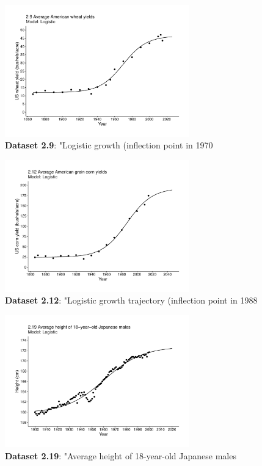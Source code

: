 \documentclass[aps,rmp,preprint,superscriptaddress,10pt,onecolumn]{article}
\begin{document}
\begin{figure}[h]
\includegraphics[width=8cm]{output/figs-ggplot/2.9.pdf}
\caption{\textbf{Dataset 2.9}: "Logistic growth (inflection point in 1970}
\end{figure}
	
\begin{figure}[h]
\includegraphics[width=8cm]{output/figs-ggplot/2.12.pdf}
\caption{\textbf{Dataset 2.12}: "Logistic growth trajectory (inflection point in 1988}
\end{figure}
	
\begin{figure}[h]
\includegraphics[width=8cm]{output/figs-ggplot/2.19.pdf}
\caption{\textbf{Dataset 2.19}: "Average height of 18-year-old Japanese males}
\end{figure}
	
\end{document}
